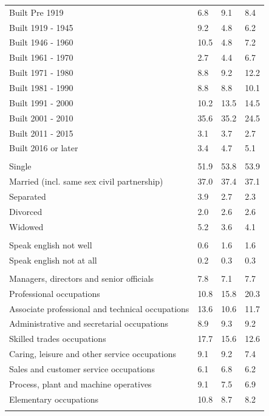 \documentclass{article}
\begin{document}
\begin{table}[h]
\begin{tabular}{KTTT}
    \hline
Built Pre 1919 & 6.8& 9.1& 8.4\\
Built 1919 - 1945 & 9.2& 4.8& 6.2\\
Built  1946 - 1960 & 10.5&  4.8&  7.2\\
Built  1961 - 1970 & 2.7& 4.4& 6.7\\
Built  1971 - 1980 &  8.8&  9.2& 12.2\\
Built  1981 - 1990 &  8.8&  8.8& 10.1\\
Built  1991 - 2000 & 10.2& 13.5& 14.5\\
Built  2001 - 2010 & 35.6& 35.2& 24.5\\
Built  2011 - 2015 & 3.1& 3.7& 2.7\\
Built  2016 or later & 3.4& 4.7& 5.1\\
\hline
    \\
    \hline
Single & 51.9& 53.8& 53.9\\
Married (incl. same sex civil partnership) & 37.0& 37.4& 37.1\\
Separated  & 3.9& 2.7& 2.3\\
Divorced  & 2.0& 2.6& 2.6\\
Widowed & 5.2& 3.6& 4.1\\
\hline
    \\ 
    \hline
Speak english not well & 0.6& 1.6& 1.6\\
Speak english not at all & 0.2& 0.3& 0.3\\
\hline
    \\
    \hline
Managers, directors and senior officials & 7.8& 7.1& 7.7\\
Professional occupations & 10.8& 15.8& 20.3\\
Associate professional and technical occupations & 13.6& 10.6& 11.7\\
Administrative and secretarial occupations & 8.9& 9.3& 9.2\\
Skilled trades occupations & 17.7& 15.6& 12.6\\
Caring, leisure and other service occupations & 9.1& 9.2& 7.4\\
Sales and customer service occupations & 6.1& 6.8& 6.2\\
Process, plant and machine operatives & 9.1& 7.5& 6.9\\
Elementary occupations & 10.8&  8.7&  8.2\\
\hline
\end{tabular}
\end{table}
\end{document}
